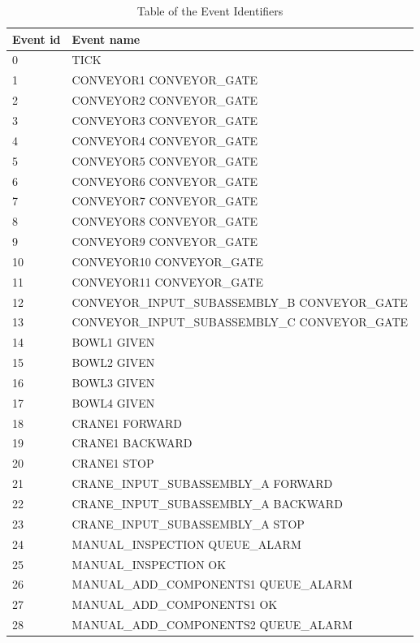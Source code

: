 \documentclass[journal]{IEEEtran}
\begin{document}
\begin{table}[!t]
\caption{Table of the Event Identifiers}
\label{eventids}
\centering
\begin{tabular}{|p{5mm}|p{55mm}|}
\hline
Event id & Event name \\
\hline
\hline
0 & TICK \\
\hline
1 & CONVEYOR1 CONVEYOR\_GATE \\
\hline
2 & CONVEYOR2 CONVEYOR\_GATE \\
\hline
3 & CONVEYOR3 CONVEYOR\_GATE \\
\hline
4 & CONVEYOR4 CONVEYOR\_GATE \\
\hline
5 & CONVEYOR5 CONVEYOR\_GATE \\
\hline
6 & CONVEYOR6 CONVEYOR\_GATE \\
\hline
7 & CONVEYOR7 CONVEYOR\_GATE \\
\hline
8 & CONVEYOR8 CONVEYOR\_GATE \\
\hline
9 & CONVEYOR9 CONVEYOR\_GATE \\
\hline
10 & CONVEYOR10 CONVEYOR\_GATE \\
\hline
11 & CONVEYOR11 CONVEYOR\_GATE \\
\hline
12 & CONVEYOR\_INPUT\_SUBASSEMBLY\_B CONVEYOR\_GATE \\
\hline
13 & CONVEYOR\_INPUT\_SUBASSEMBLY\_C CONVEYOR\_GATE \\
\hline
14 & BOWL1 GIVEN \\
\hline
15 & BOWL2 GIVEN \\
\hline
16 & BOWL3 GIVEN \\
\hline
17 & BOWL4 GIVEN \\
\hline
18 & CRANE1 FORWARD \\
\hline
19 & CRANE1 BACKWARD \\
\hline
20 & CRANE1 STOP \\
\hline
21 & CRANE\_INPUT\_SUBASSEMBLY\_A FORWARD \\
\hline
22 & CRANE\_INPUT\_SUBASSEMBLY\_A BACKWARD \\
\hline
23 & CRANE\_INPUT\_SUBASSEMBLY\_A STOP \\
\hline
24 & MANUAL\_INSPECTION QUEUE\_ALARM \\
\hline
25 & MANUAL\_INSPECTION OK \\
\hline
26 & MANUAL\_ADD\_COMPONENTS1 QUEUE\_ALARM \\
\hline
27 & MANUAL\_ADD\_COMPONENTS1 OK \\
\hline
28 & MANUAL\_ADD\_COMPONENTS2 QUEUE\_ALARM \\
\hline

\end{tabular}
\end{table}
\end{document}
